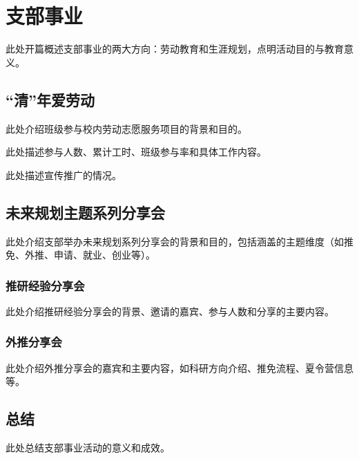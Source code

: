 \section{支部事业}

此处开篇概述支部事业的两大方向：劳动教育和生涯规划，点明活动目的与教育意义。

\subsection{``清''年爱劳动}

此处介绍班级参与校内劳动志愿服务项目的背景和目的。

此处描述参与人数、累计工时、班级参与率和具体工作内容。

此处描述宣传推广的情况。


\subsection{未来规划主题系列分享会}

此处介绍支部举办未来规划系列分享会的背景和目的，包括涵盖的主题维度（如推免、外推、申请、就业、创业等）。

\subsubsection{推研经验分享会}

此处介绍推研经验分享会的背景、邀请的嘉宾、参与人数和分享的主要内容。


\subsubsection{外推分享会}

此处介绍外推分享会的嘉宾和主要内容，如科研方向介绍、推免流程、夏令营信息等。

\subsection{总结}

此处总结支部事业活动的意义和成效。

